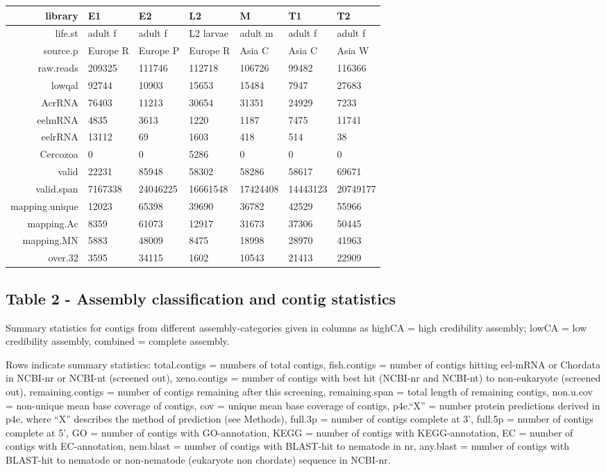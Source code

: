\documentclass[10pt]{bmc_article}
\newenvironment{bmcformat}{\begin{raggedright}\baselineskip20pt\sloppy\setboolean{publ}{false}}{\end{raggedright}\baselineskip20pt\sloppy}
\begin{document}
\begin{bmcformat}
\begin{tabular}{rllllll}
   \hline
library & E1 & E2 & L2 & M & T1 & T2 \\ 
   \hline
life.st & adult f & adult f & L2 larvae & adult m & adult f & adult f \\ 
  source.p & Europe R & Europe P & Europe R & Asia C & Asia C & Asia W \\ 
  raw.reads & 209325 & 111746 & 112718 & 106726 & 99482 & 116366 \\ 
  lowqal & 92744 & 10903 & 15653 & 15484 & 7947 & 27683 \\ 
  AcrRNA & 76403 & 11213 & 30654 & 31351 & 24929 & 7233 \\ 
  eelmRNA & 4835 & 3613 & 1220 & 1187 & 7475 & 11741 \\ 
  eelrRNA & 13112 & 69 & 1603 & 418 & 514 & 38 \\ 
  Cercozoa & 0 & 0 & 5286 & 0 & 0 & 0 \\ 
  valid & 22231 & 85948 & 58302 & 58286 & 58617 & 69671 \\ 
  valid.span & 7167338 & 24046225 & 16661548 & 17424408 & 14443123 & 20749177 \\ 
  mapping.unique & 12023 & 65398 & 39690 & 36782 & 42529 & 55966 \\ 
  mapping.Ac &  8359 & 61073 & 12917 & 31673 & 37306 & 50445 \\ 
  mapping.MN &  5883 & 48009 &  8475 & 18998 & 28970 & 41963 \\ 
  over.32 &  3595 & 34115 &  1602 & 10543 & 21413 & 22909 \\ 
   \hline
\end{tabular}
\subsection*{Table 2 - Assembly classification and contig statistics}

Summary statistics for contigs from different assembly-categories
given in columns as highCA = high credibility assembly; lowCA = low
credibility assembly, combined = complete assembly.

Rows indicate summary statistics: total.contigs = numbers of total
contigs, fish.contigs = number of contigs hitting eel-mRNA or Chordata
in NCBI-nr or NCBI-nt (screened out), xeno.contigs = number of contigs
with best hit (NCBI-nr and NCBI-nt) to non-eukaryote (screened out),
remaining.contigs = number of contigs remaining after this screening,
remaining.span = total length of remaining contigs, non.u.cov =
non-unique mean base coverage of contigs, cov = unique mean base
coverage of contigs, p4e.``X'' = number protein predictions derived in
p4e, where ``X'' describes the method of prediction (see Methods),
full.3p = number of contigs complete at 3', full.5p = number of
contigs complete at 5', GO = number of contigs with GO-annotation,
KEGG = number of contigs with KEGG-annotation, EC = number of contigs
with EC-annotation, nem.blast = number of contigs with BLAST-hit to
nematode in nr, any.blast = number of contigs with BLAST-hit to
nematode or non-nematode (eukaryote non chordate) sequence in NCBI-nr.



\end{bmcformat}
\end{document}
